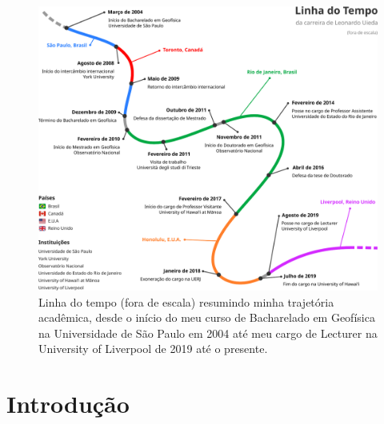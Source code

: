 \documentclass[10pt,a4paper,oneside]{book}
\begin{document}
\begin{figure}[tb]
  \begin{center}
    \includegraphics[width=\textwidth]{images/timeline.pdf}
  \end{center}
  \caption*{
    Linha do tempo (fora de escala) resumindo minha trajetória acadêmica, desde
    o início do meu curso de Bacharelado em Geofísica na Universidade de São
    Paulo em 2004 até meu cargo de Lecturer na University of Liverpool de 2019
    até o presente.
  }
\end{figure}

\tableofcontents

\mainmatter
\pagestyle{fancy}

\chapter{Introdução}
\end{document}
